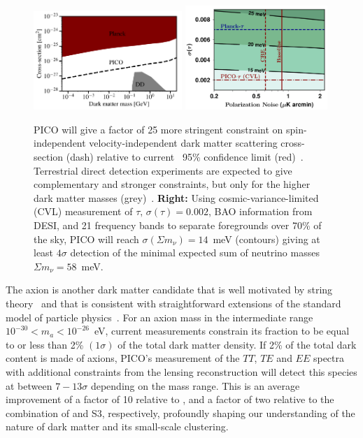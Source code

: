 \documentclass[PICOReport.tex]{subfiles}
\begin{document}
\begin{figure}[t]
\begin{center}
\includegraphics[width=0.50\textwidth]{images/pico_dd3.pdf}
\includegraphics[width=0.48\textwidth]{images/Mnu_tauprior_final.pdf}
\caption{ PICO will give a factor of 25 more stringent constraint on spin-independent velocity-independent dark matter scattering cross-section (dash) relative to current \planck\ 95\% confidence limit (red)~\citep{2018PhRvL.121h1301G}. Terrestrial direct detection experiments are expected to give complementary and stronger constraints, but only for the higher dark matter masses (grey)~\cite{2018PhRvD..97l3013K}. 
{\bf Right:} Using cosmic-variance-limited (CVL) measurement of $\tau,\, \sigma(\tau)=0.002$, \ac{BAO} information from DESI, and 21 frequency bands to separate foregrounds over 70\% of the sky, PICO will reach $\sigma(\Sigma m_{\nu}) = 14$~meV (contours) giving at least $4\sigma$ detection of the minimal expected sum of neutrino masses $\Sigma m_{\nu} = 58$~meV. 
\label{fig:DM_baryons} }
\end{center}
\vspace{-0.15in}
\end{figure}
%

The axion is another dark matter candidate that is well motivated by string theory~\citep{Arvanitaki_etal} and that is consistent with straightforward extensions of the standard model of particle physics~\citep{peccei,weinberg,wilczek}. For an axion mass in the intermediate range $10^{-30} < m_a< 10^{-26} $~eV, current measurements constrain its fraction to be equal to or less than 2\% $(1\sigma)$ of the total dark matter density. If 2\% of the total dark content is made of axions, PICO's measurement of the $TT$, $TE$ and $EE$ spectra with additional constraints from the lensing reconstruction will detect this species at between $7-13\sigma$ depending on the mass range. %
This is an average improvement of a factor of 10 relative to \planck, and a factor of two relative to the combination of \planck and S3, respectively, profoundly shaping our understanding of the nature of dark matter and its small-scale clustering. 
\end{document}

